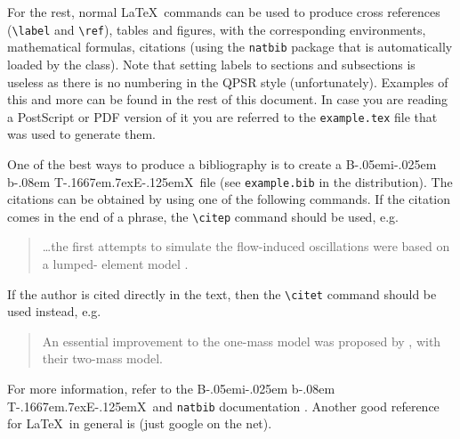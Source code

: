 \documentclass[a4paper,twoside,10pt]{fonetik}
\newcommand{\BibTeX}{{\rm B\kern-.05em{\sc i\kern-.025em b}\kern-.08em
    T\kern-.1667em\lower.7ex\hbox{E}\kern-.125emX}}
\begin{document}
For the rest, normal \LaTeX\ commands can be used to produce cross
references (\verb|\label| and \verb|\ref|), tables and figures, with
the corresponding environments, mathematical formulas, citations
(using the \verb|natbib| package that is automatically loaded by the
class). Note that setting labels to sections and subsections is
useless as there is no numbering in the QPSR style
(unfortunately). Examples of this and more can be found in the rest of
this document. In case you are reading a PostScript or PDF version of it
you are referred to the \verb|example.tex| file that was used to
generate them.

One of the best ways to produce a bibliography is to create a \BibTeX\
file (see \verb|example.bib| in the distribution). The citations can be
obtained by using one of the following commands. If the citation comes
in the end of a phrase, the \verb|\citep| command should be used,
e.g.
\begin{quote}
\ldots{}the first attempts to simulate the flow-induced oscillations
were based on a lumped- element model \citep{SmartAndSmarter68}.
\end{quote}
 If the author is cited directly in the text,
then the \verb|\citet| command should be used instead, e.g.
\begin{quote}
An essential improvement to the one-mass model was proposed by
\citet{DullAndMean98}, with their two-mass model.
\end{quote}
For more information, refer to the \BibTeX\ and {\tt natbib}
documentation \citep[e.g.][ch. 13]{companion}. Another good reference for
\LaTeX\ in general is \citep{short} (just google on the net).
\end{document}
